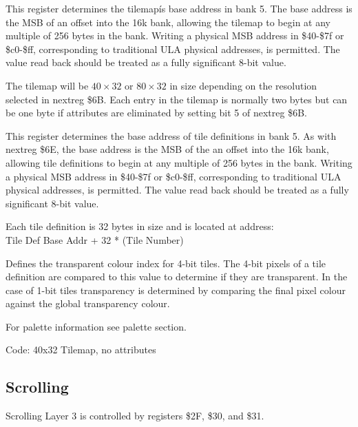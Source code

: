 

This register determines the tilemapís base address in bank 5. The
base address is the MSB of an offset into the 16k bank, allowing the
tilemap to begin at any multiple of 256 bytes in the bank. Writing a
physical MSB address in \$40-\$7f or \$c0-\$ff, corresponding to
traditional ULA physical addresses, is permitted. The value read back
should be treated as a fully significant 8-bit value.

The tilemap will be $40\times32$ or $80\times32$ in size depending on
the resolution selected in nextreg \$6B. Each entry in the tilemap is
normally two bytes but can be one byte if attributes are eliminated by
setting bit 5 of nextreg \$6B.



This register determines the base address of tile definitions in bank
5. As with nextreg \$6E, the base address is the MSB of the an offset
into the 16k bank, allowing tile definitions to begin at any multiple
of 256 bytes in the bank. Writing a physical MSB address in \$40-\$7f
or \$c0-\$ff, corresponding to traditional ULA physical addresses, is
permitted. The value read back should be treated as a fully
significant 8-bit value.

Each tile definition is 32 bytes in size and is located at address:\\
Tile Def Base Addr + 32 * (Tile Number)



Defines the transparent colour index for 4-bit tiles. The 4-bit pixels
of a tile definition are compared to this value to determine if they
are transparent. In the case of 1-bit tiles transparency is determined
by comparing the final pixel colour against the global transparency
colour.

For palette information see palette section.

Code: 40x32 Tilemap, no attributes


\subsection{Scrolling}
Scrolling Layer 3 is controlled by registers \$2F, \$30, and \$31.





